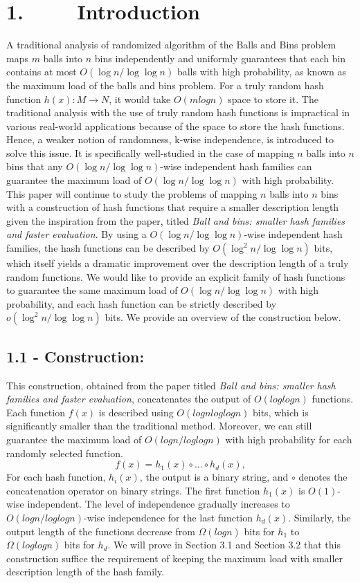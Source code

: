 \documentclass[a4paper, english]{paper}
\begin{document}
	\section{1. $\qquad$ Introduction}
	A traditional analysis of randomized algorithm of the Balls and Bins problem maps $m$ balls into $n$ bins independently and uniformly guarantees that each bin contains at most $O(\log n/\log\log n)$ balls with high probability, as known as the maximum load of the balls and bins problem. For a truly random hash function $h(x): M \rightarrow N$, it would take $O(mlogn)$ space to store it. The traditional analysis with the use of truly random hash functions is impractical in various real-world applications because of the space to store the hash functions. Hence, a weaker notion of randomness, k-wise independence, is introduced to solve this issue. It is specifically well-studied in the case of mapping $n$ balls into $n$ bins that any $O(\log n/\log\log n)$-wise independent hash families can guarantee the maximum load of $O(\log n/\log\log n)$ with high probability. \\
	\indent This paper will continue to study the problems of mapping $n$ balls into $n$ bins with a construction of hash functions that require a smaller description length given the inspiration from the paper, titled \textit{Ball and bins: smaller hash families and faster evaluation}. By using a $O(\log n/\log\log n)$-wise independent hash families, the hash functions can be described by $O(\log^2 n/\log\log n)$ bits, which itself yields a dramatic improvement over the description length of a truly random functions. We would like to provide an explicit family of hash functions to guarantee the same maximum load of $O(\log n/\log\log n)$ with high probability, and each hash function can be strictly described by $o(\log^2 n/\log\log n)$ bits. We provide an overview of the construction below.   \\
	
	\subsection{1.1 - Construction:}
	This construction, obtained from the paper  titled \textit{Ball and bins: smaller hash families and faster evaluation}, concatenates the output of  $O(log log n)$ functions. Each function $f(x)$ is described using $O(logn loglogn)$ bits, which is significantly smaller than the traditional method. Moreover, we can still guarantee the maximum load of $O(log n/ log log n)$ with high probability for each randomly selected function.
			$$f(x) = h_1(x) \circ ... \circ h_d(x),$$
	For each hash function, $h_i(x)$, the output is a binary string, and $\circ$ denotes the concatenation operator on binary strings. The first function $h_1(x)$ is $O(1)$-wise independent. The level of independence gradually increases to $O(log n/ log log n)$-wise independence for the last function $h_d(x)$. Similarly, the output length of the functions decrease from $\Omega(logn)$ bits for $h_1$ to $\Omega(loglogn)$ bits for $h_d$. We will prove in Section 3.1 and Section 3.2 that this construction suffice the requirement of keeping the maximum load with smaller description length of the hash family. \\
	
\end{document}
